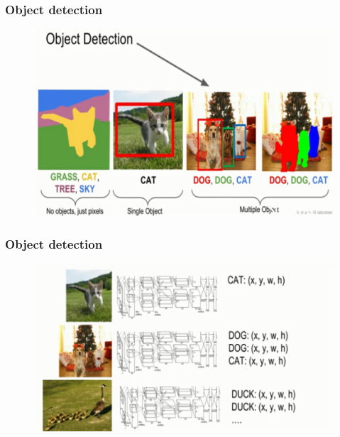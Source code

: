 \documentclass{beamer}
\begin{document}
\begin{frame}
	\frametitle{Object detection}
	
	\begin{figure}
		\includegraphics[width=\linewidth]{Pics/detect1.PNG}
		
	\end{figure}
	
\end{frame}
\begin{frame}
	\frametitle{Object detection}
	
	\begin{figure}
		\includegraphics[width=\linewidth]{Pics/objectdetect.PNG}
		
	\end{figure}
	
\end{frame}
\end{document}
